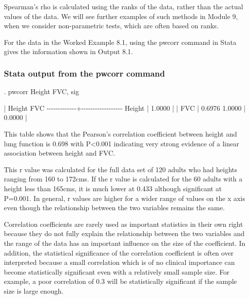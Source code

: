 \documentclass[
]{memoir}
\newenvironment{Shaded}{\begin{snugshade}}{\end{snugshade}}
\newcommand{\NormalTok}[1]{#1}
\begin{document}
Spearman's rho is calculated using the ranks of the data, rather than the actual values of the data. We will see further examples of such methods in Module 9, when we consider non-parametric tests, which are often based on ranks.

For the data in the Worked Example 8.1, using the pwcorr command in Stata gives the information shown in Output 8.1.

\hypertarget{stata-output-from-the-pwcorr-command}{%
\subsubsection{Stata output from the pwcorr command}\label{stata-output-from-the-pwcorr-command}}

\begin{Shaded}
\begin{Highlighting}[]
\NormalTok{. pwcorr Height FVC, sig}

\NormalTok{             |   Height      FVC}
\NormalTok{{-}{-}{-}{-}{-}{-}{-}{-}{-}{-}{-}{-}{-}+{-}{-}{-}{-}{-}{-}{-}{-}{-}{-}{-}{-}{-}{-}{-}{-}{-}{-}}
\NormalTok{      Height |   1.0000 }
\NormalTok{             |}
\NormalTok{             |}
\NormalTok{         FVC |   0.6976   1.0000 }
\NormalTok{             |   0.0000}
\NormalTok{             |}
\end{Highlighting}
\end{Shaded}

This table shows that the Pearson's correlation coefficient between height and lung function is 0.698 with P\textless0.001 indicating very strong evidence of a linear association between height and FVC.

This r value was calculated for the full data set of 120 adults who had heights ranging from 160 to 172cms. If the r value is calculated for the 60 adults with a height less than 165cms, it is much lower at 0.433 although significant at P=0.001. In general, r values are higher for a wider range of values on the x axis even though the relationship between the two variables remains the same.

Correlation coefficients are rarely used as important statistics in their own right because they do not fully explain the relationship between the two variables and the range of the data has an important influence on the size of the coefficient. In addition, the statistical significance of the correlation coefficient is often over interpreted because a small correlation which is of no clinical importance can become statistically significant even with a relatively small sample size. For example, a poor correlation of 0.3 will be statistically significant if the sample size is large enough.
\end{document}
